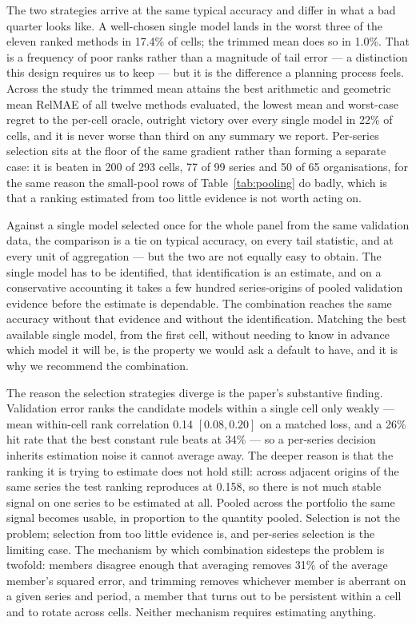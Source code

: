 \documentclass[11pt]{article}
\begin{document}
The two strategies arrive at the same typical accuracy and differ in what a bad quarter looks like. A well-chosen single model lands in the worst three of the eleven ranked methods in 17.4\% of cells; the trimmed mean does so in 1.0\%. That is a frequency of poor ranks rather than a magnitude of tail error --- a distinction this design requires us to keep --- but it is the difference a planning process feels. Across the study the trimmed mean attains the best arithmetic and geometric mean RelMAE of all twelve methods evaluated, the lowest mean and worst-case regret to the per-cell oracle, outright victory over every single model in 22\% of cells, and it is never worse than third on any summary we report. Per-series selection sits at the floor of the same gradient rather than forming a separate case: it is beaten in 200 of 293 cells, 77 of 99 series and 50 of 65 organisations, for the same reason the small-pool rows of Table~\ref{tab:pooling} do badly, which is that a ranking estimated from too little evidence is not worth acting on.

Against a single model selected once for the whole panel from the same validation data, the comparison is a tie on typical accuracy, on every tail statistic, and at every unit of aggregation --- but the two are not equally easy to obtain. The single model has to be identified, that identification is an estimate, and on a conservative accounting it takes a few hundred series-origins of pooled validation evidence before the estimate is dependable. The combination reaches the same accuracy without that evidence and without the identification. Matching the best available single model, from the first cell, without needing to know in advance which model it will be, is the property we would ask a default to have, and it is why we recommend the combination.

The reason the selection strategies diverge is the paper's substantive finding. Validation error ranks the candidate models within a single cell only weakly --- mean within-cell rank correlation 0.14 $[0.08, 0.20]$ on a matched loss, and a 26\% hit rate that the best constant rule beats at 34\% --- so a per-series decision inherits estimation noise it cannot average away. The deeper reason is that the ranking it is trying to estimate does not hold still: across adjacent origins of the same series the test ranking reproduces at 0.158, so there is not much stable signal on one series to be estimated at all. Pooled across the portfolio the same signal becomes usable, in proportion to the quantity pooled. Selection is not the problem; selection from too little evidence is, and per-series selection is the limiting case. The mechanism by which combination sidesteps the problem is twofold: members disagree enough that averaging removes 31\% of the average member's squared error, and trimming removes whichever member is aberrant on a given series and period, a member that turns out to be persistent within a cell and to rotate across cells. Neither mechanism requires estimating anything.
\end{document}
